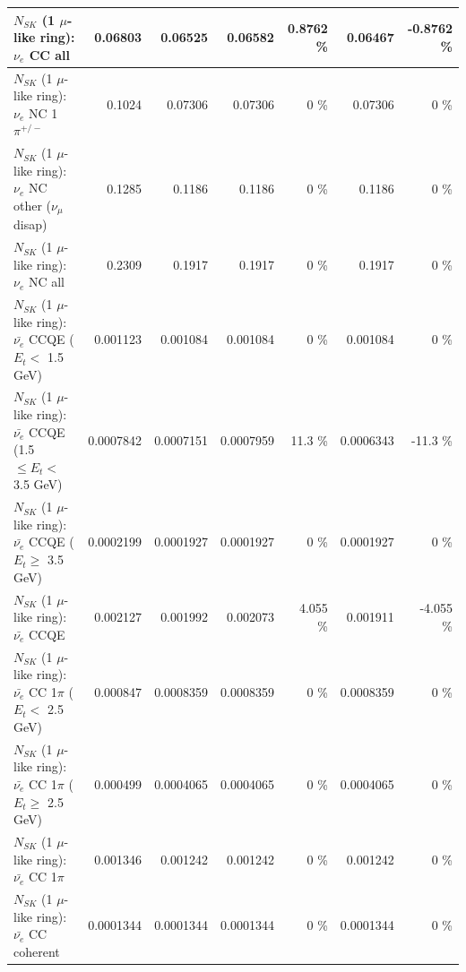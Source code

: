 \begin{table}
\begin{tabular}{| l | r | r | r  r | r  r |}
                                  $N_{SK}$ (1 $\mu$-like ring): $\nu_{e}$ CC all &         0.06803 &         0.06525 &         0.06582 &   0.8762 \%  &         0.06467 &  -0.8762 \%  \\ 
\hline
                           $N_{SK}$ (1 $\mu$-like ring): $\nu_e$ NC 1$\pi^{+/-}$ &          0.1024 &         0.07306 &         0.07306 &        0 \%  &         0.07306 &        0 \%  \\ 
                $N_{SK}$ (1 $\mu$-like ring): $\nu_e$ NC other ($\nu_\mu$ disap) &          0.1285 &          0.1186 &          0.1186 &        0 \%  &          0.1186 &        0 \%  \\ 
                                  $N_{SK}$ (1 $\mu$-like ring): $\nu_{e}$ NC all &          0.2309 &          0.1917 &          0.1917 &        0 \%  &          0.1917 &        0 \%  \\ 
\hline
\hline
\hline
            $N_{SK}$ (1 $\mu$-like ring): $\bar{\nu_e}$ CCQE ($E_{t} <$ 1.5 GeV) &        0.001123 &        0.001084 &        0.001084 &        0 \%  &        0.001084 &        0 \%  \\ 
   $N_{SK}$ (1 $\mu$-like ring): $\bar{\nu_e}$ CCQE (1.5 $\leq E_{t} <$ 3.5 GeV) &       0.0007842 &       0.0007151 &       0.0007959 &     11.3 \%  &       0.0006343 &    -11.3 \%  \\ 
         $N_{SK}$ (1 $\mu$-like ring): $\bar{\nu_e}$ CCQE ($E_{t} \geq$ 3.5 GeV) &       0.0002199 &       0.0001927 &       0.0001927 &        0 \%  &       0.0001927 &        0 \%  \\ 
\hline
                                $N_{SK}$ (1 $\mu$-like ring): $\bar{\nu_e}$ CCQE &        0.002127 &        0.001992 &        0.002073 &    4.055 \%  &        0.001911 &   -4.055 \%  \\ 
\hline
       $N_{SK}$ (1 $\mu$-like ring): $\bar{\nu_e}$ CC 1$\pi$ ($E_{t} <$ 2.5 GeV) &        0.000847 &       0.0008359 &       0.0008359 &        0 \%  &       0.0008359 &        0 \%  \\ 
    $N_{SK}$ (1 $\mu$-like ring): $\bar{\nu_e}$ CC 1$\pi$ ($E_{t} \geq$ 2.5 GeV) &        0.000499 &       0.0004065 &       0.0004065 &        0 \%  &       0.0004065 &        0 \%  \\ 
\hline
                           $N_{SK}$ (1 $\mu$-like ring): $\bar{\nu_e}$ CC 1$\pi$ &        0.001346 &        0.001242 &        0.001242 &        0 \%  &        0.001242 &        0 \%  \\ 
                         $N_{SK}$ (1 $\mu$-like ring): $\bar{\nu_e}$ CC coherent &       0.0001344 &       0.0001344 &       0.0001344 &        0 \%  &       0.0001344 &        0 \%  \\ 

\end{tabular}
\end{table}
